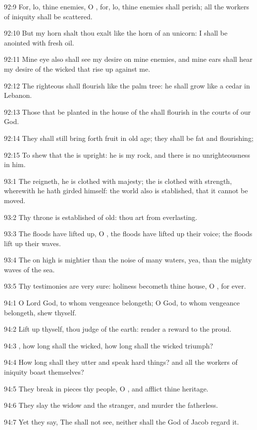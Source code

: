 92:9 For, lo, thine enemies, O \LORD, for, lo, thine enemies shall
perish; all the workers of iniquity shall be scattered.

92:10 But my horn shalt thou exalt like the horn of an unicorn: I
shall be anointed with fresh oil.

92:11 Mine eye also shall see my desire on mine enemies, and mine ears
shall hear my desire of the wicked that rise up against me.

92:12 The righteous shall flourish like the palm tree: he shall grow
like a cedar in Lebanon.

92:13 Those that be planted in the house of the \LORD shall flourish in
the courts of our God.

92:14 They shall still bring forth fruit in old age; they shall be fat
and flourishing;

92:15 To shew that the \LORD is upright: he is my rock, and there is no
unrighteousness in him.



93:1 The \LORD reigneth, he is clothed with majesty; the \LORD is
clothed with strength, wherewith he hath girded himself: the world
also is stablished, that it cannot be moved.

93:2 Thy throne is established of old: thou art from everlasting.

93:3 The floods have lifted up, O \LORD, the floods have lifted up
their voice; the floods lift up their waves.

93:4 The \LORD on high is mightier than the noise of many waters, yea,
than the mighty waves of the sea.

93:5 Thy testimonies are very sure: holiness becometh thine house, O
\LORD, for ever.



94:1 O Lord God, to whom vengeance belongeth; O God, to whom vengeance
belongeth, shew thyself.

94:2 Lift up thyself, thou judge of the earth: render a reward to the
proud.

94:3 \LORD, how long shall the wicked, how long shall the wicked
triumph?

94:4 How long shall they utter and speak hard things? and all the
workers of iniquity boast themselves?

94:5 They break in pieces thy people, O \LORD, and afflict thine
heritage.

94:6 They slay the widow and the stranger, and murder the fatherless.

94:7 Yet they say, The \LORD shall not see, neither shall the God of
Jacob regard it.

